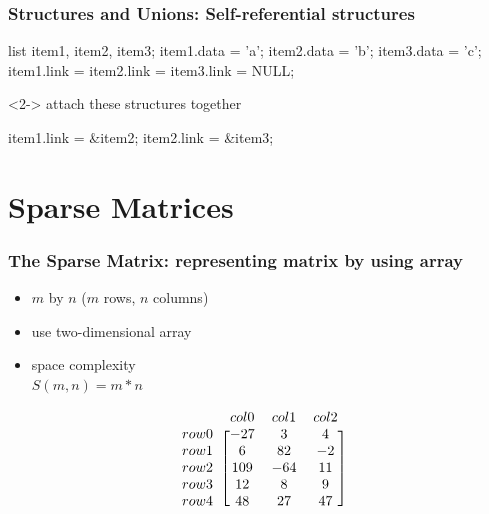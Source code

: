 \documentclass[newPxFont,sthlmFooter,nooffset]{beamer}
\begin{document}
\begin{frame}[t, fragile]
  \frametitle{Structures and Unions: {\large Self-referential structures}}
\begin{codedef}
list item1, item2, item3;
item1.data = 'a';
item2.data = 'b';
item3.data = 'c';
item1.link = item2.link = item3.link = NULL;   
\end{codedef}
\begin{uncoverenv}<2->
attach these structures together
\begin{codedef}
item1.link = &item2;
item2.link = &item3;
\end{codedef}
\end{uncoverenv}
\end{frame}





\section{Sparse Matrices}

\begin{frame}[t, fragile]
  \frametitle{The Sparse Matrix: {\large representing matrix by using array}}
  \begin{itemize}
  \item $m$ by $n$ ($m$ rows, $n$ columns)
  \item use two-dimensional array
  \item space complexity \\
        $S(m, n) = m *n$
  \end{itemize}

\begin{equation*}
  \begin{blockarray}{r *{3}{c}}
      & col0 & col1 & col2 \\
\begin{block}{l [*{3}{c}]}
 row0 & -27  &   3  &  4   \\
 row1 &   6  &  82  &  -2  \\
 row2 & 109  & -64  &  11   \\
 row3 &  12  &   8  &  9   \\
 row4 &  48  &  27  & 47   \\
\end{block}
  \end{blockarray}
\end{equation*}
\end{frame}
\end{document}
